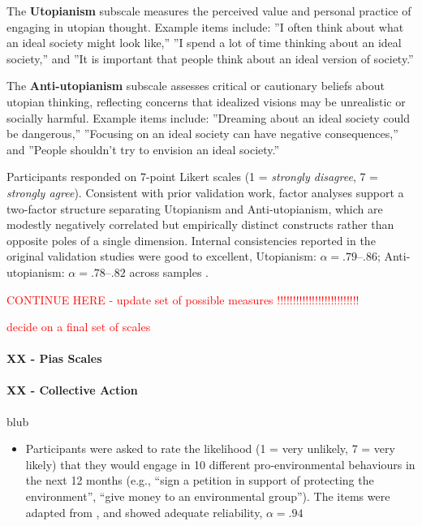 \documentclass[jou,floatsintext]{apa7}
\begin{document}
The \textbf{Utopianism} subscale measures the perceived value and personal practice of engaging in utopian thought. Example items include: ''I often think about what an ideal society might look like,'' ''I spend a lot of time thinking about an ideal society,'' and ''It is important that people think about an ideal version of society.'' 

The \textbf{Anti-utopianism} subscale assesses critical or cautionary beliefs about utopian thinking, reflecting concerns that idealized visions may be unrealistic or socially harmful. Example items include: ''Dreaming about an ideal society could be dangerous,'' ''Focusing on an ideal society can have negative consequences,'' and ''People shouldn’t try to envision an ideal society.''

Participants responded on 7-point Likert scales (1 = \textit{strongly disagree}, 7 = \textit{strongly agree}). Consistent with prior validation work, factor analyses support a two-factor structure separating Utopianism and Anti-utopianism, which are modestly negatively correlated but empirically distinct constructs rather than opposite poles of a single dimension. Internal consistencies reported in the original validation studies were good to excellent, Utopianism: $\alpha = .79$–$.86$; Anti-utopianism: $\alpha = .78$–$.82$ across samples \parencite{fernandoFunctionsUtopiaHow2018}.











\textcolor{red}{CONTINUE HERE - update set of possible measures !!!!!!!!!!!!!!!!!!!!!!!!!!}


\textcolor{red}{decide on a final set of scales}

\paragraph{XX - Pias Scales}


\paragraph{XX - Collective Action}

blub

\begin{itemize}
    \item Participants were asked to rate the likelihood (1 = very unlikely,  7 = very likely) that they would engage in 10 different pro‐environmental behaviours in the next 12 months (e.g., “sign a petition in  support of protecting the environment”, “give money to an environmental group”). The items were adapted from \textcite{bainCobenefitsAddressingClimate2016}, and  showed adequate reliability, $\alpha = .94$ \parencite{fernandoGreensSpaceInvaders2020}
\end{itemize}
\end{document}
